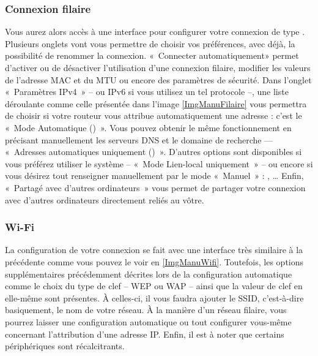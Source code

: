 \subsubsection{Connexion filaire}
Vous aurez alors accès à une interface pour configurer votre connexion de type . Plusieurs onglets vont vous permettre de choisir vos préférences, avec déjà, la possibilité de renommer la connexion. «~Connecter automatiquement» permet d'activer ou de désactiver l'utilisation d'une connexion filaire, modifier les valeurs de l'adresse MAC et du MTU ou encore des paramètres de sécurité. Dans l'onglet «~Paramètres IPv4~» -- ou IPv6 si vous utilisez un tel protocole --, une liste déroulante comme celle présentée dans l'image \ref{ImgManuFilaire} vous permettra de choisir si votre routeur vous attribue automatiquement une adresse  : c'est le «~Mode Automatique ()~». Vous pouvez obtenir le même fonctionnement en précisant manuellement les serveurs DNS et le domaine de recherche --- «~Adresses automatiques uniquement ()~». \label{RefAvahi} D'autres options sont disponibles si vous préférez utiliser le système  -- «~Mode Lien-local uniquement~» -- ou encore si vous désirez tout renseigner manuellement par le mode «~Manuel~» : , \ldots{} Enfin, «~Partagé avec d'autres ordinateurs~» vous permet de partager votre connexion avec d'autres ordinateurs directement reliés au vôtre.
\subsubsection{Wi-Fi}
La configuration de votre connexion  se fait avec une interface très similaire à la précédente comme vous pouvez le voir en \ref{ImgManuWifi}. Toutefois, les options supplémentaires précédemment décrites lors de la configuration automatique comme le choix du type de clef -- WEP ou WAP -- ainsi que la valeur de clef en elle-même sont présentes. À celles-ci, il vous faudra ajouter le SSID, c'est-à-dire basiquement, le nom de votre réseau. À la manière d'un réseau filaire, vous pourrez laisser une configuration automatique ou tout configurer vous-même concernant l'attribution d'une adresse IP. Enfin, il est à noter que certains périphériques  sont récalcitrants.
\GestionReseauManuel

